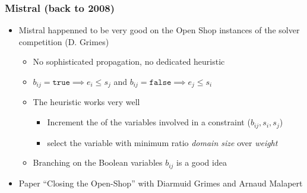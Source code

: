 \begin{frame}
\frametitle{Mistral (back to 2008)}

\pause
\begin{itemize}
  \item Mistral happenned to be very good on the Open Shop instances of the solver competition (D. Grimes)

  \vfill\pause
  \begin{itemize}
     \item No sophisticated propagation, no dedicated heuristic

     \vfill
     \item {} $b_{ij} = \texttt{true} \implies e_i \leq s_j$ and $b_{ij} = \texttt{false} \implies e_j \leq s_i$
   \end{itemize} 

   \vfill\pause
   \begin{itemize}
     \item The  heuristic works very well

     \vfill
     \begin{itemize}
       \item Increment the  of the variables involved in a  constraint ($b_{ij},s_i,s_j$)

       \vfill
       \item select the variable with minimum ratio \emph{domain size} over \emph{weight}
     \end{itemize}

      \vfill\pause
      \item Branching on the Boolean variables $b_{ij}$ is a good idea

   \end{itemize}

   \vfill\pause
   \item Paper ``Closing the Open-Shop'' with Diarmuid Grimes and Arnaud Malapert
\end{itemize}

\end{frame}


